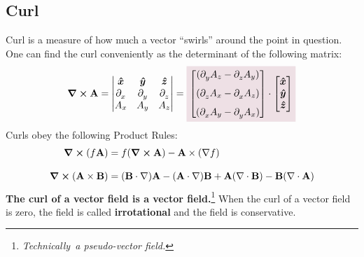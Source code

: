     \subsection*{Curl}
        Curl is a measure of how much a vector ``swirls'' around the point in question. One can find the curl conveniently as the determinant of the following matrix: 
        \begin{equation}
            \curl \vb{A} = 
            \begin{vmatrix}
            \e{x}&\e{y}&\e{z}
            \\
            \pder*{x}&\pder*{y}&\pder*{z}
            \\
            A_x&A_y&A_z
            \end{vmatrix}
            =\coloredanswer{
            \begin{bmatrix}
            (\pder*{y} A_z-\pder*{z} A_y)
            \\[0.25 cm]
            (\pder*{z} A_x-\pder*{x} A_z)
            \\[0.25 cm]
            (\pder*{x} A_y-\pder*{y} A_x)
            \end{bmatrix}
            \cdot
            \begin{bmatrix}
            \e{x}
            \\
            \e{y}
            \\
            \e{z}
            \end{bmatrix}}
        \end{equation}
        Curls obey the following Product Rules:
        \begin{align*}
        \curl (f\vb{A}) &= f(\curl \vb{A}) - \vb{A} \times (\nabla f)
        \\[0.3 cm]
        \curl (\vb{A} \times \vb{B}) &= (\vb{B} \cdot \nabla)\vb{A} - (\vb{A} \cdot \nabla)\vb{B} + \vb{A}(\nabla \cdot \vb{B}) - \vb{B}(\nabla \cdot \vb{A})
        \end{align*}
        \textcolor{Blue1}{\bf The curl of a vector field is a vector field.}\footnote{\sl Technically\rm\ a pseudo-vector field.} When the curl of a vector field is zero, the field is called {\bf irrotational} and the field is conservative. %
